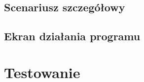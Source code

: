 \documentclass{article}
\begin{document}
    \subsection{Scenariusz szczegółowy}
    
    \subsection{Ekran działania programu}

\section{Testowanie}
\end{document}
